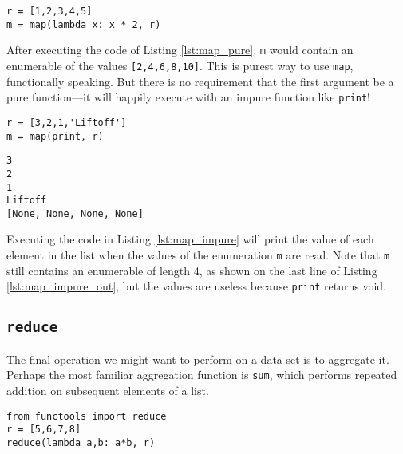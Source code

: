 \documentclass{article}\usepackage{beamerarticle}
\begin{document}
\begin{frame}[fragile]
\begin{lstlisting}[style=python,caption={Doubling Each Element},label={lst:map_pure}]
r = [1,2,3,4,5]
m = map(lambda x: x * 2, r)
\end{lstlisting}
\end{frame}

\noindent After executing the code of Listing \ref{lst:map_pure}, \texttt{m} would contain an enumerable of the values \texttt{[2,4,6,8,10]}. This is purest way to use \texttt{map}, functionally speaking. But there is no requirement that the first argument be a pure function---it will happily execute with an impure function like \texttt{print}!

\begin{frame}[fragile]
\begin{lstlisting}[style=python,caption={\texttt{map} With an Impure Function},label={lst:map_impure}]
r = [3,2,1,'Liftoff']
m = map(print, r)
\end{lstlisting}
\end{frame}

\begin{lstlisting}[caption={Output of Listing \ref{lst:map_impure}},label={lst:map_impure_out}]
3
2
1
Liftoff
[None, None, None, None]
\end{lstlisting}

\noindent Executing the code in Listing \ref{lst:map_impure} will print the value of each element in the list when the values of the enumeration \texttt{m} are read. Note that \texttt{m} still contains an enumerable of length 4, as shown on the last line of Listing \ref{lst:map_impure_out}, but the values are useless because \texttt{print} returns void.

\subsection{\tt reduce}
The final operation we might want to perform on a data set is to aggregate it. Perhaps the most familiar aggregation function is \texttt{sum}, which performs repeated addition on subsequent elements of a list.

\begin{frame}[fragile]
\begin{lstlisting}[style=python,caption={List Multiplication},label={lst:reduce_mult}]
from functools import reduce
r = [5,6,7,8]
reduce(lambda a,b: a*b, r)
\end{lstlisting}
\end{frame}
\end{document}

